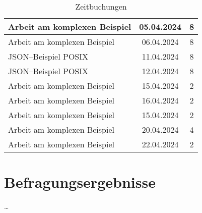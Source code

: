 \begin{table}[H]
\begin{tabular}{|l|c|c|}
        \hline
        Arbeit am komplexen Beispiel           & 05.04.2024 & 8              \\
        \hline
        Arbeit am komplexen Beispiel           & 06.04.2024 & 8              \\
        \hline
        \ac{JSON}--Beispiel \ac{POSIX}         & 11.04.2024 & 8              \\
        \hline
        \ac{JSON}--Beispiel \ac{POSIX}         & 12.04.2024 & 8              \\
        \hline
        Arbeit am komplexen Beispiel           & 15.04.2024 & 2              \\
        \hline
        Arbeit am komplexen Beispiel           & 16.04.2024 & 2              \\
        \hline
        Arbeit am komplexen Beispiel           & 15.04.2024 & 2              \\
        \hline
        Arbeit am komplexen Beispiel           & 20.04.2024 & 4              \\
        \hline
        Arbeit am komplexen Beispiel           & 22.04.2024 & 2              \\
        \hline
    \end{tabular}
    \caption{Zeitbuchungen}
    \label{tab:zeitbuchungen-long}
\end{table}


\section{Befragungsergebnisse}\label{sec:befragungsergebnisse}
\ldots